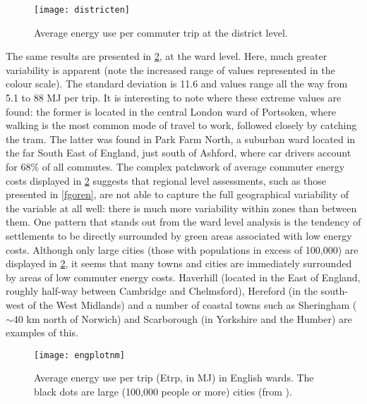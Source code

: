 \begin{figure}[htbp]
\begin{center}
    \texttt{[image: districten]}  \end{center}
  \caption[Average energy use per commuter trip at the district level]
  {Average energy use per commuter trip at the district level.}
 \label{fdistricten}
\end{figure}

The same results are presented in \cref{fengplotnm}, at the ward level.
Here, much greater variability is apparent (note the increased range of
values represented in the colour scale). The standard deviation is 11.6
and values range all the way from 5.1 to 88 MJ per trip.
It is interesting to note where these extreme values are found:
the former is located in the central London ward of
Portsoken, where walking is the most common mode of travel to work,
followed closely by catching the tram. The latter was
found in Park Farm North,
a suburban ward located in the far South East of England, just south of
Ashford, where car drivers account for 68\% of all commutes. The complex
patchwork of average  commuter energy costs displayed in \cref{fengplotnm}
suggests that regional level assessments, such as those
presented in \cref{fgoren}, are not able to capture the full geographical
variability of the variable at all well: there is much more variability
within zones than between them. One pattern that stands out from the ward level
analysis is the tendency of settlements to be directly surrounded by green areas
associated with low energy costs. Although only large cities (those with
populations in excess of 100,000) are displayed in
\cref{fengplotnm}, it seems that many towns and cities are immediately surrounded
by areas of low commuter energy costs. Haverhill (located in the East of
England, roughly half-way between Cambridge and Chelmsford),
Hereford (in the south-west of the West Midlands) and a number of coastal
towns such as  Sheringham ($\sim$40 km north of Norwich) and Scarborough
(in Yorkshire and the Humber) are examples of this.
\begin{figure}[htbp]
\begin{center}
    \texttt{[image: engplotnm]}  \end{center}
  \caption[Average energy use per trip (Etrp, in MJ) in English wards]
  {Average energy use per trip (Etrp, in MJ) in English wards.
  The black dots are large (100,000 people or more) cities (from
  \citet{Brownrigg2013}).}
 \label{fengplotnm}
\end{figure}

